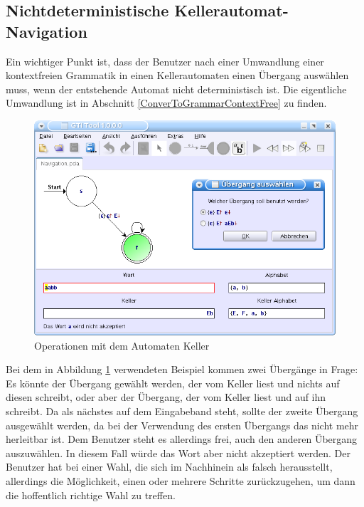 \subsection{Nichtdeterministische Kellerautomat-Navigation}\label{InteractionPDA}

Ein wichtiger Punkt ist, dass der Benutzer nach einer Umwandlung einer
kontextfreien Grammatik in einen Kellerautomaten einen Übergang auswählen muss,
wenn der entstehende Automat nicht deterministisch ist. Die eigentliche
Umwandlung ist in Abschnitt \ref{ConverToGrammarContextFree} zu
finden.\vspace{10pt}

\begin{figure}[h!]
\begin{center}
\includegraphics[width=12cm]{../images/grammar_pda.png}
\caption{Operationen mit dem Automaten Keller}
\label{FigureGrammarPDA}
\end{center}
\end{figure}
\vspace{10pt}

Bei dem in Abbildung \ref{FigureGrammarPDA} verwendeten Beispiel kommen zwei
Übergänge in Frage: Es könnte der Übergang gewählt werden, der  vom
Keller liest und nichts auf diesen schreibt, oder aber der Übergang, der
 vom Keller liest und  auf ihn schreibt.
Da  als nächstes auf dem Eingabeband steht, sollte der zweite Übergang
ausgewählt werden, da bei der Verwendung des ersten Übergangs das 
nicht mehr herleitbar ist. Dem Benutzer steht es allerdings frei, auch den
anderen Übergang auszuwählen. In diesem Fall würde das Wort
 aber nicht akzeptiert werden. Der
Benutzer hat bei einer Wahl, die sich im Nachhinein als falsch herausstellt,
allerdings die Möglichkeit, einen oder mehrere Schritte zurückzugehen, um dann
die hoffentlich richtige Wahl zu treffen.\vspace{10pt}


